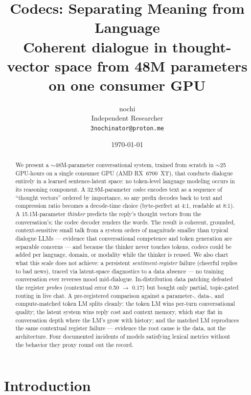 \documentclass[11pt]{article}
\title{Codecs: Separating Meaning from Language\\
  \large Coherent dialogue in thought-vector space from 48M parameters on one consumer GPU}
\author{nochi \\ Independent Researcher \\ \texttt{3nochinator@proton.me}}
\date{\today}
\begin{document}
\maketitle

\begin{abstract}
We present a $\sim$48M-parameter conversational system, trained from scratch
in $\sim$25 GPU-hours on a single consumer GPU (AMD RX~6700~XT), that
conducts dialogue entirely in a learned sentence-latent space: no
token-level language modeling occurs in its reasoning component. A
32.9M-parameter \emph{codec} encodes text as a sequence of ``thought
vectors'' ordered by importance, so any prefix decodes back to text and
compression ratio becomes a decode-time choice (byte-perfect at 4:1,
readable at 8:1). A 15.1M-parameter \emph{thinker} predicts the reply's
thought vectors from the conversation's; the codec decoder renders the
words. The result is coherent, grounded, context-sensitive small talk from
a system orders of magnitude smaller than typical dialogue LLMs ---
evidence that conversational competence and token generation are separable
concerns --- and because the thinker never touches tokens, codecs could be
added per language, domain, or modality while the thinker is reused. We
also chart what this scale does not achieve: a persistent
\emph{sentiment-register} failure (cheerful replies to bad news), traced
via latent-space diagnostics to a data absence --- no training conversation
ever reverses mood mid-dialogue. In-distribution data patching defeated the
register \emph{probes} (contextual error 0.50 $\to$ 0.17) but bought only
partial, topic-gated routing in live chat. A pre-registered comparison
against a parameter-, data-, and compute-matched token LM splits cleanly:
the token LM wins per-turn conversational quality; the latent system wins
reply cost and context memory, which stay flat in conversation depth where
the LM's grow with history; and the matched LM reproduces the same
contextual register failure --- evidence the root cause is the data, not
the architecture. Four documented incidents of models satisfying lexical
metrics without the behavior they proxy round out the record.
\end{abstract}

\section{Introduction}
\label{sec:intro}
\end{document}
